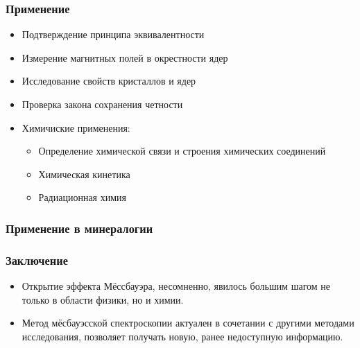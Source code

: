 \documentclass[t]{beamer}
\begin{document}
\begin{frame}
  \frametitle{Применение}
  
  \begin{itemize}
    \item Подтверждение принципа эквивалентности\pause
    \item Измерение магнитных полей в окрестности ядер\pause
    \item Исследование свойств кристаллов и ядер\pause
    \item Проверка закона сохранения четности\pause
    \item Химичиские применения:
      \begin{itemize}
        \item Определение химической связи и строения химических соединений
        \item Химическая кинетика
        \item Радиационная химия
      \end{itemize}

  \end{itemize}
\end{frame}

\begin{frame}
  \frametitle{Применение в минералогии}
  
\end{frame}

\begin{frame}
  \frametitle{Заключение}
  \begin{itemize}
    \item Открытие эффекта Мёссбауэра, несомненно, явилось большим шагом не
      только в области физики, но и химии. \pause
    \item Метод мёсбауэсской спектроскопии актуален в сочетании с другими
      методами исследования, позволяет получать новую, ранее недоступную
      информацию.
  \end{itemize}
\end{frame}

\ITMOthankspage
\end{document}
